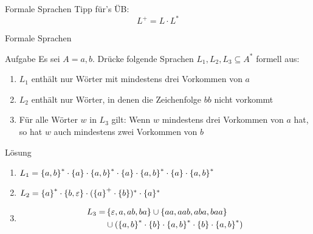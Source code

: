 \begin{frame}{Formale Sprachen}
    Tipp für's ÜB:
    \[
    	L^+ = L \cdot L^*
    \]
\end{frame}

\begin{frame}{Formale Sprachen}
	\begin{exampleblock}{Aufgabe}
		Es sei $A = {a,b}$. Drücke folgende Sprachen $L_1, L_2, L_3 \subseteq A^*$ formell aus:
		\begin{enumerate}
			\item $L_1$ enthält nur Wörter mit mindestens drei Vorkommen von $a$
			\item $L_2$ enthält nur Wörter, in denen die Zeichenfolge $bb$ nicht vorkommt
			\item Für alle Wörter $w$ in $L_3$ gilt: Wenn $w$ mindestens drei Vorkommen von $a$ hat, so hat $w$ auch mindestens zwei Vorkommen von $b$ 
		\end{enumerate}
	\end{exampleblock}
	\pause
	\begin{block}{Lösung}
		\begin{enumerate}
			\item $L_1 = \left\{ a,b \right\}^\ast \cdot \left\{ a \right\} \cdot \left\{ a,b \right\}^\ast \cdot \left\{ a \right\} \cdot \left\{ a,b \right\}^\ast \cdot \left\{ a \right\} \cdot \left\{ a,b \right\}^\ast$
			\item $L_2 = \left\{ a \right\}^\ast \cdot \left\{ b, \varepsilon \right\} \cdot (\left\{ a \right\}^+ \cdot \left\{ b \right\})^\ast \cdot \{ a \}^*$ 
			\item \begin{align*}L_3 = & \left\{ \varepsilon, a, ab, ba \right\} \cup \left\{ aa, aab, aba, baa \right\} \\ & \cup (\left\{ a,b \right\}^\ast \cdot \left\{ b \right\} \cdot \left\{ a,b \right\}^\ast \cdot \left\{ b \right\} \cdot \left\{ a,b \right\}^\ast) \end{align*}
		\end{enumerate}
	\end{block}
\end{frame}